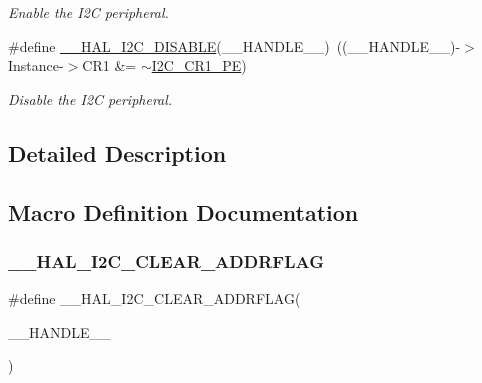 \begin{DoxyCompactItemize}
\begin{DoxyCompactList}\small\item\em Enable the I2C peripheral. \end{DoxyCompactList}\item 
\#define \mbox{\hyperlink{group___i2_c___exported___macros_ga3d6a35da02ca72537a15570912c80412}{\+\_\+\+\_\+\+H\+A\+L\+\_\+\+I2\+C\+\_\+\+D\+I\+S\+A\+B\+LE}}(\+\_\+\+\_\+\+H\+A\+N\+D\+L\+E\+\_\+\+\_\+)~((\+\_\+\+\_\+\+H\+A\+N\+D\+L\+E\+\_\+\+\_\+)-\/$>$Instance-\/$>$C\+R1 \&=  $\sim$\mbox{\hyperlink{group___peripheral___registers___bits___definition_ga953b0d38414808db79da116842ed3262}{I2\+C\+\_\+\+C\+R1\+\_\+\+PE}})
\begin{DoxyCompactList}\small\item\em Disable the I2C peripheral. \end{DoxyCompactList}\end{DoxyCompactItemize}


\subsection{Detailed Description}


\subsection{Macro Definition Documentation}
\mbox{\label{group___i2_c___exported___macros_ga15a0a1a04971d44f9a1b82cab10af24f}} 
\subsubsection{\texorpdfstring{\+\_\+\+\_\+\+H\+A\+L\+\_\+\+I2\+C\+\_\+\+C\+L\+E\+A\+R\+\_\+\+A\+D\+D\+R\+F\+L\+AG}{\_\_HAL\_I2C\_CLEAR\_ADDRFLAG}}
{\footnotesize\ttfamily \#define \+\_\+\+\_\+\+H\+A\+L\+\_\+\+I2\+C\+\_\+\+C\+L\+E\+A\+R\+\_\+\+A\+D\+D\+R\+F\+L\+AG(\begin{DoxyParamCaption}\item[{}]{\+\_\+\+\_\+\+H\+A\+N\+D\+L\+E\+\_\+\+\_\+ }\end{DoxyParamCaption})}

